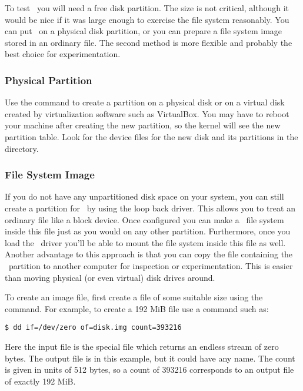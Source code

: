 To test \GenericFS\ you will need a free disk partition. The size is not critical, although it
would be nice if it was large enough to exercise the file system reasonably. You can put
\GenericFS\ on a physical disk partition, or you can prepare a file system image stored in an
ordinary file. The second method is more flexible and probably the best choice for
experimentation.

\subsubsection{Physical Partition}

Use the  command to create a partition on a physical disk or on a virtual disk
created by virtualization software such as VirtualBox. You may have to reboot your machine after
creating the new partition, so the kernel will see the new partition table. Look for the device
files for the new disk and its partitions in the  directory.


\subsubsection{File System Image}

If you do not have any unpartitioned disk space on your system, you can still create a partition
for \GenericFS\ by using the loop back driver. This allows you to treat an ordinary file like a
block device. Once configured you can make a \GenericFS\ file system inside this file just as
you would on any other partition. Furthermore, once you load the \GenericFS\ driver you'll be
able to mount the file system inside this file as well. Another advantage to this approach is
that you can copy the file containing the \GenericFS\ partition to another computer for
inspection or experimentation. This is easier than moving physical (or even virtual) disk drives
around.

To create an image file, first create a file of some suitable size using the 
command. For example, to create a 192 MiB file use a command such as:
\begin{verbatim}
$ dd if=/dev/zero of=disk.img count=393216
\end{verbatim}

Here the input file is the special file  which returns an endless stream of
zero bytes. The output file is  in this example, but it could have any name.
The count is given in units of 512 bytes, so a count of 393216 corresponds to an output file of
exactly 192 MiB.

